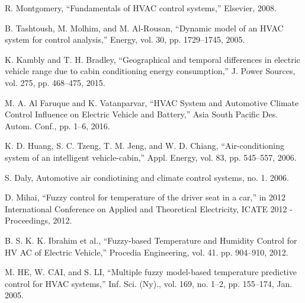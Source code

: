 R. Montgomery, ``Fundamentals of HVAC control systems,'' Elsevier, 2008.

B. Tashtoush, M. Molhim, and M. Al-Rousan, ``Dynamic model of an HVAC system for control analysis,'' Energy, vol. 30, pp. 1729–1745, 2005.



K. Kambly and T. H. Bradley, ``Geographical and temporal differences in electric vehicle range due to cabin conditioning energy consumption,'' J. Power Sources, vol. 275, pp. 468–475, 2015.

M. A. Al Faruque and K. Vatanparvar, ``HVAC System and Automotive Climate Control Influence on Electric Vehicle and Battery,'' Asia South Pacific Des. Autom. Conf., pp. 1–6, 2016.

K. D. Huang, S. C. Tzeng, T. M. Jeng, and W. D. Chiang, ``Air-conditioning system of an intelligent vehicle-cabin,'' Appl. Energy, vol. 83, pp. 545–557, 2006.

S. Daly, Automotive air condiotining and climate control systems, no. 1. 2006.

	D. Mihai, ``Fuzzy control for temperature of the driver seat in a car,'' in 2012 International Conference on Applied and Theoretical Electricity, ICATE 2012 - Proceedings, 2012.

	B. S. K. K. Ibrahim et al., ``Fuzzy-based Temperature and Humidity Control for HV AC of Electric Vehicle,'' Procedia Engineering, vol. 41. pp. 904–910, 2012.




	M. HE, W. CAI, and S. LI, ``Multiple fuzzy model-based temperature predictive control for HVAC systems,'' Inf. Sci. (Ny)., vol. 169, no. 1–2, pp. 155–174, Jan. 2005.

